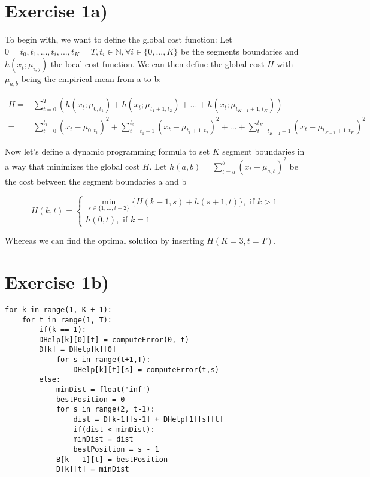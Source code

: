 \section*{Exercise 1a)} %
\label{sec:Exercise 1a)}

To begin with, we want to define the global cost function:
Let $0 = t_0 ,t_1,...,t_i,...,t_K = T, t_i \in \mathbb{N}, \forall i \in \{0,...,K\}$ be the segments boundaries and 
$h(x_t;\mu_{i,j})$ the local cost function. 
We can then define the global cost $H$ with $\mu_{a,b}$ being the empirical mean from a to b:
 
\begin{align} 
	H =& \sum_{t=0}^{T}(h(x_t;\mu_{0,t_1})+h(x_t;\mu_{t_{1}+1,t_2})+...+h(x_t;\mu_{t_{K-1}+1,t_K})) \\
	  =& \sum_{t=0}^{t_1}(x_t-\mu_{0,t_1})^2 + \sum_{t=t_1+1}^{t_2}(x_t-\mu_{t_1+1,t_2})^2 + ...  + \sum_{t=t_{K-1}+1}^{t_K}(x_t-\mu_{t_{K-1}+1,t_K})^2 
\end{align}

Now let's define a dynamic programming formula to set $K$ segment boundaries in a way that minimizes the global cost $H$.
Let $h(a,b) = \sum_{t=a}^{b}(x_t-\mu_{a,b})^2 $ be the cost between the segment boundaries a and b

\[
H(k,t) = 
	\begin{cases}
		\min_{s \in \{1,...,t-2\}}\{H(k-1,s) + h(s+1,t)\}, \text{ if } k > 1 \\
		h(0,t), \text{ if } k = 1
	\end{cases}
\]

Whereas we can find the optimal solution by inserting $H(K=3,t=T)$.


\section*{Exercise 1b)} %
\label{sec:Exercise 1b)}
\begin{lstlisting}
for k in range(1, K + 1):
	for t in range(1, T):
		if(k == 1):
		DHelp[k][0][t] = computeError(0, t)
		D[k] = DHelp[k][0]
			for s in range(t+1,T): 
				DHelp[k][t][s] = computeError(t,s)
		else:
			minDist = float('inf')
			bestPosition = 0
			for s in range(2, t-1):
				dist = D[k-1][s-1] + DHelp[1][s][t]
				if(dist < minDist):
				minDist = dist
				bestPosition = s - 1
			B[k - 1][t] = bestPosition
			D[k][t] = minDist  
\end{lstlisting}

